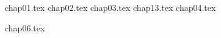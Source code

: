 
\newcommand{\mbeq}{\overset{!}{=}}  %
\newcommand\anno[1]{\textcolor{red}{#1}}
\usepackage{accents}
%
%

%
% 
% 
% 
% 

\frontmatter
{}
%
%
%
%
%
\renewcommand{\contentsname}{Table of Contents}
\tableofcontents*
{}
\mainmatter
{chap01.tex}
\clearemptydoublepage
{chap02.tex}
\clearemptydoublepage
%
{chap03.tex}
\clearemptydoublepage
{chap13.tex}
\clearemptydoublepage
{chap04.tex}
\clearemptydoublepage


{chap06.tex}
\clearemptydoublepage
%
%
%
\backmatter

\clearemptydoublepage
%
%   
